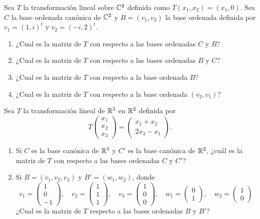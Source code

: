 \begin{exerciselist}
  \item Sea $T$ la transformación lineal sobre $\mathbb{C}^2$ definida como $T(x_1, x_2) = (x_1, 0)$. Sea $C$ la base ordenada canónica de $\mathbb{C}^2$ y $B = (v_1, v_2)$ la base ordenada definida por $v_1 = (1, i)^t$ y $v_2 = (-i, 2)^t$.
    \begin{enumerate}
      \item ¿Cual es la matriz de $T$ con respecto a las bases ordenadas $C$ y $B$?
      \item ¿Cual es la matriz de $T$ con respecto a las bases ordenadas $B$ y $C$?
      \item ¿Cual es la matriz de $T$ con respecto a la base ordenada $B$?
      \item ¿Cual es la matriz de $T$ con respecto a la base ordenada $(v_2, v_1)$?
    \end{enumerate}

  \item Sea $T$ la transformación lineal de $\mathbb{R}^3$ en $\mathbb{R}^2$ definida por 
    \[ T\begin{pmatrix} x_1 \\ x_2 \\ x_3 \end{pmatrix} = \begin{pmatrix} x_1 + x_2 \\ 2x_3 - x_1 \end{pmatrix}. \]
    \begin{enumerate}
      \item Si $C$ es la base canónica de $\mathbb{R}^3$ y $C'$ es la base canónica de $\mathbb{R}^2$, ¿cuál es la matriz de $T$ con respecto a las bases ordenadas $C$ y $C'$?
      \item Si $B = (v_1, v_2, v_3)$ y $B' = (w_1, w_2)$, donde
        \[
          v_1 = \begin{pmatrix} 1 \\ 0 \\ -1 \end{pmatrix}, \quad
          v_2 = \begin{pmatrix} 1 \\ 1 \\ 1 \end{pmatrix}, \quad
          v_3 = \begin{pmatrix} 1 \\ 0 \\ 0 \end{pmatrix}, \quad
          w_1 = \begin{pmatrix} 0 \\ 1 \end{pmatrix}, \quad
          w_2 = \begin{pmatrix} 1 \\ 0 \end{pmatrix}
        \]
        ¿Cual es la matriz de $T$ respecto a las bases ordenadas $B$ y $B'$?
    \end{enumerate}


\end{exerciselist}
